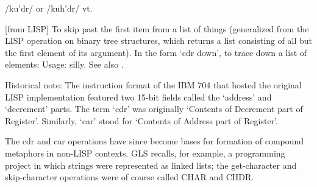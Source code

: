  /ku'dr/ or /kuh'dr/ vt.

[from LISP] To skip past the first item from a list of things (generalized from
the LISP operation on binary tree structures, which returns a list consisting of
all but the first element of its argument). In the form `cdr down', to trace
down a list of elements:  Usage:
silly. See also .

Historical note: The instruction format of the IBM 704 that hosted the original
LISP implementation featured two 15-bit fields called the `address' and
`decrement' parts. The term `cdr' was originally `Contents of Decrement part of
Register'. Similarly, `car' stood for `Contents of Address part of Register'.

The cdr and car operations have since become bases for formation of compound
metaphors in non-LISP contexts. GLS recalls, for example, a programming project
in which strings were represented as linked lists; the get-character and
skip-character operations were of course called CHAR and CHDR.

